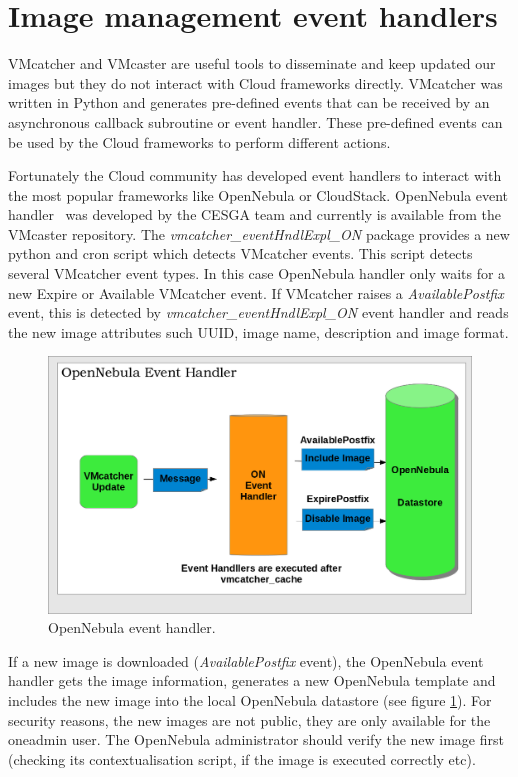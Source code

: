 \documentclass{cai}
\begin{document}
\section{Image management event handlers}
\label{sect-handlers}
VMcatcher and VMcaster are useful tools to disseminate and keep updated our images but they do not interact with Cloud frameworks directly.
VMcatcher was written in Python and generates pre-defined events that can be received by an asynchronous callback subroutine or event handler.
These pre-defined events can be used by the Cloud frameworks to perform different actions.

Fortunately the Cloud community has developed event handlers to interact with the most popular frameworks like OpenNebula or CloudStack.
OpenNebula event handler~\cite{onevent} was developed by the CESGA team and currently is available from the VMcaster repository. 
The \textit{vmcatcher\_eventHndlExpl\_ON} package provides a new python and cron script which detects VMcatcher events. 
This script detects several VMcatcher event types. In this case OpenNebula handler only waits for a new Expire or Available VMcatcher event.
If VMcatcher raises a \textit{AvailablePostfix} event, this is detected by \textit{vmcatcher\_eventHndlExpl\_ON} event handler and reads the new image attributes such UUID, image name, description and image format.

\begin{figure}
\centering
\includegraphics[width=1\textwidth]{ONeventhandler.png}
\caption{OpenNebula event handler.}
\label{fig:onevent}
\end{figure}

If a new image is downloaded (\textit{AvailablePostfix} event), the OpenNebula event handler gets the image information, generates a new OpenNebula template and includes the new image into the local OpenNebula datastore (see figure \ref{fig:onevent}). 
For security reasons, the new images are not public, they are only available for the oneadmin user. The OpenNebula administrator should verify the new image first (checking its contextualisation script, if the image is executed correctly etc).
\end{document}
